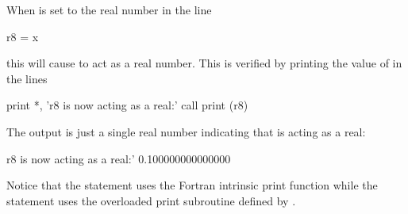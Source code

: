 \documentclass{hitec}     %
\begin{document}
When  is set to the real number  in the line
\begin{example}
    r8 = x
\end{example}
this will cause  to act as a real number. This is verified by printing the value of  in the lines
\begin{example}
  print *, 'r8 is now acting as a real:'
  call print (r8)
\end{example}
The output is just a single real number indicating that  is acting as a real:
\begin{example}
  r8 is now acting as a real:'
  0.100000000000000
\end{example}
Notice that the  statement uses the Fortran intrinsic print function while the  statement uses the overloaded print subroutine defined by .
\end{document}
